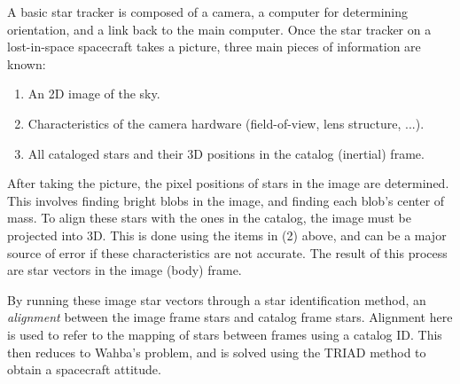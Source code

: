 A basic star tracker is composed of a camera, a computer for determining orientation, and a link back to the main computer. Once the star tracker on a lost-in-space spacecraft takes a picture, three main pieces of information are known:
\begin{enumerate}
\item An 2D image of the sky. 
\item Characteristics of the camera hardware (field-of-view, lens structure, ...).
\item All cataloged stars and their 3D positions in the catalog (inertial) frame.
\end{enumerate}

After taking the picture, the pixel positions of stars in the  image are determined. This involves finding bright blobs in the image, and finding each blob's center of mass. To align these stars with the ones in the catalog, the image must be projected into 3D. This is done using the items in (2) above, and can be a major source of error if these characteristics are not accurate. The result of this process are star vectors in the image (body) frame. 

By running these image star vectors through a star identification method, an \textit{alignment} between the image frame stars and catalog frame stars. Alignment here is used to refer to the mapping of stars between frames using a catalog ID. This then reduces to Wahba's problem, and is solved using the TRIAD method to obtain a spacecraft attitude.